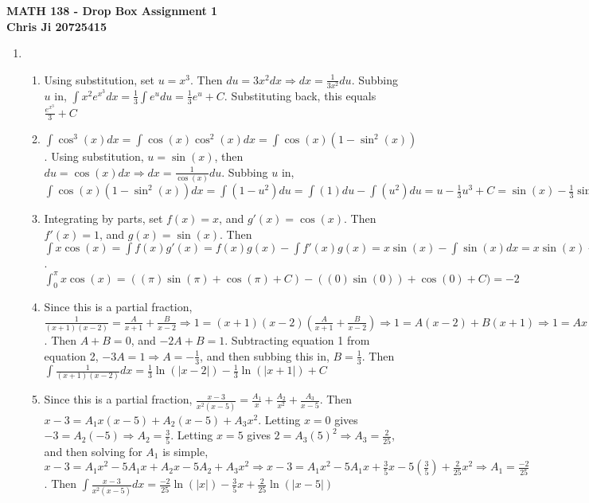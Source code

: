 \documentclass[10pt,english]{article}
\begin{document}
\noindent \begin{center}
\textbf{\large{}MATH 138 - Drop Box Assignment 1}\\
\textbf{\large{}Chris Ji 20725415}
\par\end{center}{\large \par}
\medskip{}

\begin{enumerate}
\item \begin{enumerate}
    \item Using substitution, set $u=x^3$. Then $du=3x^2dx\Rightarrow dx=\frac{1}{3x^2}du$. Subbing $u$ in, $\int x^2e^{x^3}dx=\frac{1}{3}\int e^udu=\frac{1}{3}e^u+C$. Substituting back, this equals $\frac{e^{x^3}}{3}+C$
    
    \item $\int\cos^3(x)dx=\int\cos(x)\cos^2(x)dx=\int\cos(x)(1-\sin^2(x))$. Using substitution, $u=\sin(x)$, then $du=\cos(x)dx\Rightarrow dx=\frac{1}{\cos(x)}du$. Subbing $u$ in, $\int\cos(x)(1-\sin^2(x))dx=\int(1-u^2)du=\int(1)du-\int(u^2)du=u-\frac{1}{3}u^3+C=\sin(x)-\frac{1}{3}\sin^3(x)+C$
    
    \item Integrating by parts, set $f(x)=x$, and $g'(x)=\cos(x)$. Then $f'(x)=1$, and $g(x)=\sin(x)$. Then $\int x\cos(x)=\int f(x)g'(x)=f(x)g(x)-\int f'(x)g(x)=x\sin(x)-\int\sin(x)dx=x\sin(x)-(-\cos(x))+C$. $\int_0^\pi x\cos(x)=((\pi)\sin(\pi)+\cos(\pi)+C)-((0)\sin(0))+\cos(0)+C)=-2$ 
    
    \item Since this is a partial fraction, $\frac{1}{(x+1)(x-2)}=\frac{A}{x+1}+\frac{B}{x-2}\Rightarrow 1=(x+1)(x-2)\left(\frac{A}{x+1}+\frac{B}{x-2}\right)\Rightarrow1=A(x-2)+B(x+1)\Rightarrow 1=Ax-2A+Bx+B$. Then $A+B=0$, and $-2A+B=1$. Subtracting equation 1 from equation 2, $-3A=1\Rightarrow A=-\frac{1}{3}$, and then subbing this in, $B=\frac{1}{3}$. Then $\int\frac{1}{(x+1)(x-2)}dx=\frac{1}{3}\ln(|x-2|)-\frac{1}{3}\ln(|x+1|)+C$
    
    \item Since this is a partial fraction, $\frac{x-3}{x^2(x-5)}=\frac{A_1}{x}+\frac{A_2}{x^2}+\frac{A_3}{x-5}$. Then $x-3=A_1x(x-5)+A_2(x-5)+A_3x^2$. Letting $x=0$ gives $-3=A_2(-5)\Rightarrow A_2=\frac{3}{5}$. Letting $x=5$ gives $2=A_3(5)^2\Rightarrow A_3=\frac{2}{25}$, and then solving for $A_1$ is simple, $x-3=A_1x^2-5A_1x+A_2x-5A_2+A_3x^2\Rightarrow x-3=A_1x^2-5A_1x+\frac{3}{5}x-5\left(\frac{3}{5}\right)+\frac{2}{25}x^2\Rightarrow A_1=\frac{-2}{25}$. Then $\int\frac{x-3}{x^2(x-5)}dx=\frac{-2}{25}\ln(|x|)-\frac{3}{5}x+\frac{2}{25}\ln(|x-5|)$
    

\end{enumerate}
\end{enumerate}
\end{document}
